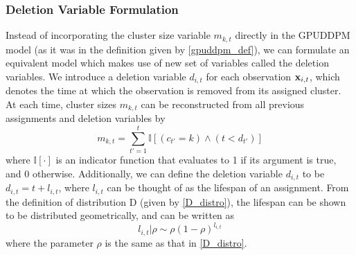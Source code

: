 \documentclass{article}
\begin{document}
\subsubsection{Deletion Variable Formulation}
\label{sec:deletionvariableformulation}

Instead of incorporating the cluster size variable $m_{k,t}$ directly in the GPUDDPM model (as it was in the definition given by \eqref{gpuddpm_def}), we can formulate an equivalent model which makes use of new set of variables called the deletion variables. We introduce a deletion variable $d_{i,t}$ for each observation $\bold{x}_{i,t}$, which denotes the time at which the observation is removed from its assigned cluster. At each time, cluster sizes $m_{k,t}$ can be reconstructed from all previous assignments and deletion variables by
\begin{equation}
\label{compute_clust_size}
m_{k,t} = \sum_{t' = 1}^{t} \mathbb{I}[(c_{t'}=k) \wedge (t < d_{t'})]
\end{equation}
where $\mathbb{I}[\cdot]$ is an indicator function that evaluates to 1 if its argument is true, and 0 otherwise. Additionally, we can define the deletion variable $d_{i,t}$ to be $d_{i,t} = t + l_{i,t}$, where $l_{i,t}$ can be thought of as the lifespan of an assignment. From the definition of distribution D (given by \eqref{D_distro}), the lifespan can be shown to be distributed geometrically, and can be written as
\begin{equation}
\label{del_rho_form}
l_{i,t} | \rho  \sim  \rho(1 - \rho)^{l_{i,t}}
\end{equation}
where the parameter $\rho$ is the same as that in \eqref{D_distro}.
\end{document}

